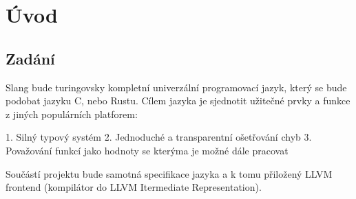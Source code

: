 \section{Úvod}

\subsection{Zadání}
Slang bude turingovsky kompletní univerzální programovací jazyk, který se bude podobat jazyku C, nebo Rustu. 
Cílem jazyka je sjednotit užitečné prvky a funkce z jiných populárních platforem:

1. Silný typový systém
2. Jednoduché a transparentní ošetřování chyb
3. Považování funkcí jako hodnoty se kterýma je možné dále pracovat

Součástí projektu bude samotná specifikace jazyka a k tomu přiložený LLVM frontend (kompilátor
do LLVM Itermediate Representation).
